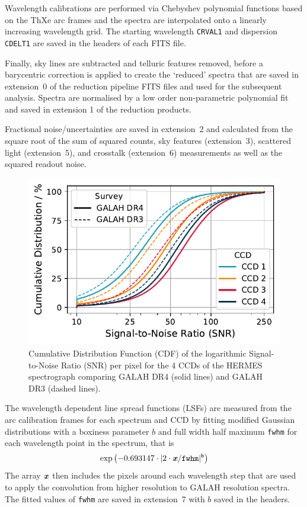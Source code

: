 \documentclass[
  journal=pasa,
  manuscript=research-paper, %
  year=2024,
  volume=37
]{cup-journal}
\begin{document}
Wavelength calibrations are performed via Chebyshev polynomial functions based on the ThXe arc frames and the spectra are interpolated onto a linearly increasing wavelength grid. The starting wavelength \texttt{CRVAL1} and dispersion \texttt{CDELT1} are saved in the headers of each FITS file.

Finally, sky lines are subtracted and telluric features removed, before a barycentric correction is applied to create the `reduced' spectra that are saved in extension~0 of the reduction pipeline FITS files and used for the subsequent analysis. Spectra are normalised by a low order non-parametric polynomial fit and saved in extension 1 of the reduction products.

Fractional noise/uncertainties are saved in extension~2 and calculated from the square root of the sum of squared counts, sky features (extension~3), scattered light (extension~5), and crosstalk (extension~6) measurements as well as the squared readout noise.

\begin{figure}[ht]
    \centering
    \includegraphics[width=\columnwidth]{figures/snr_distribution.pdf}
    \caption{Cumulative Distribution Function (CDF) of the logarithmic Signal-to-Noise Ratio (SNR) per pixel for the 4 CCDs of the HERMES spectrograph comparing GALAH DR4 (solid lines) and GALAH DR3 (dashed lines).}
    \label{fig:snr_distribution}
\end{figure}

The wavelength dependent line spread functions (LSFs) are measured from the arc calibration frames for each spectrum and CCD by fitting modified Gaussian distributions with a boxiness parameter $b$ and full width half maximum \texttt{fwhm} for each wavelength point in the spectrum, that is
\begin{align}
    \exp \left(-0.693147 \cdot \vert 2 \cdot \textbf{\textit{x}}/\texttt{fwhm} \vert^\texttt{b}\right) \label{eq:lsf}
\end{align}
The array $\textbf{\textit{x}}$ then includes the pixels around each wavelength step that are used to apply the convolution from higher resolution to GALAH resolution spectra. The fitted values of \texttt{fwhm} are saved in extension~7 with $b$ saved in the headers.
\end{document}
